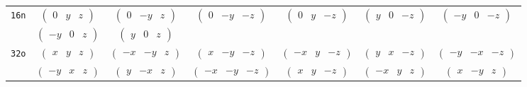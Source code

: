 \documentclass[fleqn,9pt,landscape]{jsarticle}
\begin{document}
\begin{center}
\begin{longtable}{ccccccc}
{\tt 16n} & $ \begin{pmatrix} 0 & y & z \end{pmatrix} $ & $ \begin{pmatrix} 0 & - y & z \end{pmatrix} $ & $ \begin{pmatrix} 0 & - y & - z \end{pmatrix} $ & $ \begin{pmatrix} 0 & y & - z \end{pmatrix} $ & $ \begin{pmatrix} y & 0 & - z \end{pmatrix} $ & $ \begin{pmatrix} - y & 0 & - z \end{pmatrix} $ \\
& $ \begin{pmatrix} - y & 0 & z \end{pmatrix} $ & $ \begin{pmatrix} y & 0 & z \end{pmatrix} $ & $  $ & $  $ & $  $ & $  $ \\ \hline
{\tt 32o} & $ \begin{pmatrix} x & y & z \end{pmatrix} $ & $ \begin{pmatrix} - x & - y & z \end{pmatrix} $ & $ \begin{pmatrix} x & - y & - z \end{pmatrix} $ & $ \begin{pmatrix} - x & y & - z \end{pmatrix} $ & $ \begin{pmatrix} y & x & - z \end{pmatrix} $ & $ \begin{pmatrix} - y & - x & - z \end{pmatrix} $ \\
& $ \begin{pmatrix} - y & x & z \end{pmatrix} $ & $ \begin{pmatrix} y & - x & z \end{pmatrix} $ & $ \begin{pmatrix} - x & - y & - z \end{pmatrix} $ & $ \begin{pmatrix} x & y & - z \end{pmatrix} $ & $ \begin{pmatrix} - x & y & z \end{pmatrix} $ & $ \begin{pmatrix} x & - y & z \end{pmatrix} $ \\

\end{longtable}
\end{center}
\end{document}
